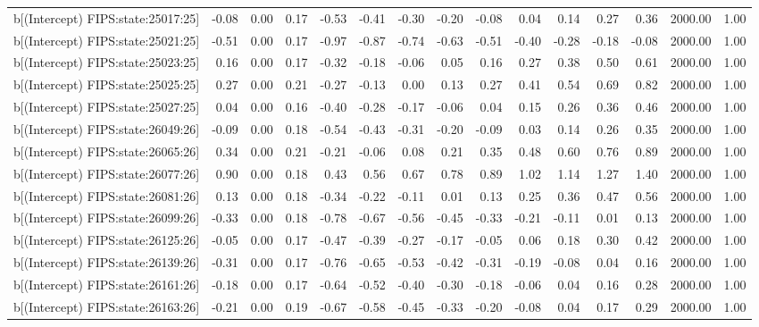 \begin{table}[ht]
\begin{tabular}{rrrrrrrrrrrrrrr}
  b[(Intercept) FIPS:state:25017:25] & -0.08 & 0.00 & 0.17 & -0.53 & -0.41 & -0.30 & -0.20 & -0.08 & 0.04 & 0.14 & 0.27 & 0.36 & 2000.00 & 1.00 \\ 
  b[(Intercept) FIPS:state:25021:25] & -0.51 & 0.00 & 0.17 & -0.97 & -0.87 & -0.74 & -0.63 & -0.51 & -0.40 & -0.28 & -0.18 & -0.08 & 2000.00 & 1.00 \\ 
  b[(Intercept) FIPS:state:25023:25] & 0.16 & 0.00 & 0.17 & -0.32 & -0.18 & -0.06 & 0.05 & 0.16 & 0.27 & 0.38 & 0.50 & 0.61 & 2000.00 & 1.00 \\ 
  b[(Intercept) FIPS:state:25025:25] & 0.27 & 0.00 & 0.21 & -0.27 & -0.13 & 0.00 & 0.13 & 0.27 & 0.41 & 0.54 & 0.69 & 0.82 & 2000.00 & 1.00 \\ 
  b[(Intercept) FIPS:state:25027:25] & 0.04 & 0.00 & 0.16 & -0.40 & -0.28 & -0.17 & -0.06 & 0.04 & 0.15 & 0.26 & 0.36 & 0.46 & 2000.00 & 1.00 \\ 
  b[(Intercept) FIPS:state:26049:26] & -0.09 & 0.00 & 0.18 & -0.54 & -0.43 & -0.31 & -0.20 & -0.09 & 0.03 & 0.14 & 0.26 & 0.35 & 2000.00 & 1.00 \\ 
  b[(Intercept) FIPS:state:26065:26] & 0.34 & 0.00 & 0.21 & -0.21 & -0.06 & 0.08 & 0.21 & 0.35 & 0.48 & 0.60 & 0.76 & 0.89 & 2000.00 & 1.00 \\ 
  b[(Intercept) FIPS:state:26077:26] & 0.90 & 0.00 & 0.18 & 0.43 & 0.56 & 0.67 & 0.78 & 0.89 & 1.02 & 1.14 & 1.27 & 1.40 & 2000.00 & 1.00 \\ 
  b[(Intercept) FIPS:state:26081:26] & 0.13 & 0.00 & 0.18 & -0.34 & -0.22 & -0.11 & 0.01 & 0.13 & 0.25 & 0.36 & 0.47 & 0.56 & 2000.00 & 1.00 \\ 
  b[(Intercept) FIPS:state:26099:26] & -0.33 & 0.00 & 0.18 & -0.78 & -0.67 & -0.56 & -0.45 & -0.33 & -0.21 & -0.11 & 0.01 & 0.13 & 2000.00 & 1.00 \\ 
  b[(Intercept) FIPS:state:26125:26] & -0.05 & 0.00 & 0.17 & -0.47 & -0.39 & -0.27 & -0.17 & -0.05 & 0.06 & 0.18 & 0.30 & 0.42 & 2000.00 & 1.00 \\ 
  b[(Intercept) FIPS:state:26139:26] & -0.31 & 0.00 & 0.17 & -0.76 & -0.65 & -0.53 & -0.42 & -0.31 & -0.19 & -0.08 & 0.04 & 0.16 & 2000.00 & 1.00 \\ 
  b[(Intercept) FIPS:state:26161:26] & -0.18 & 0.00 & 0.17 & -0.64 & -0.52 & -0.40 & -0.30 & -0.18 & -0.06 & 0.04 & 0.16 & 0.28 & 2000.00 & 1.00 \\ 
  b[(Intercept) FIPS:state:26163:26] & -0.21 & 0.00 & 0.19 & -0.67 & -0.58 & -0.45 & -0.33 & -0.20 & -0.08 & 0.04 & 0.17 & 0.29 & 2000.00 & 1.00 \\ 

\end{tabular}
\end{table}
